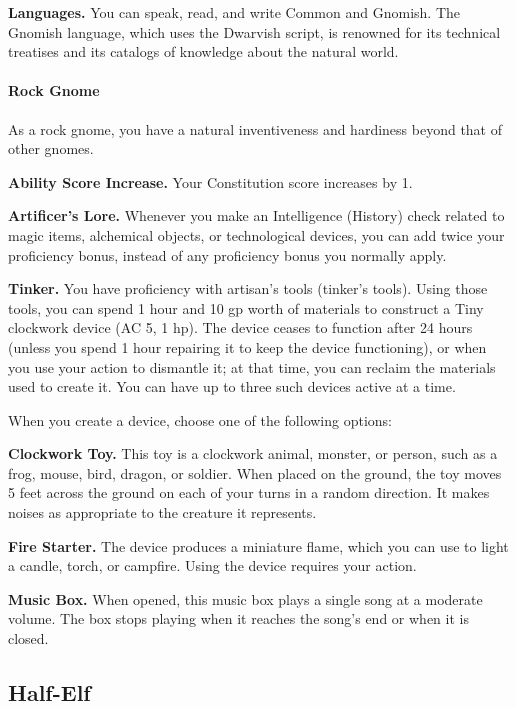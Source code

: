 \textbf{Languages.} You can speak, read, and write Common and Gnomish.
The Gnomish language, which uses the Dwarvish script, is renowned for
its technical treatises and its catalogs of knowledge about the natural
world.

\hypertarget{rock-gnome}{%
\paragraph{Rock Gnome}\label{rock-gnome}}

As a rock gnome, you have a natural inventiveness and hardiness beyond
that of other gnomes.

\textbf{Ability Score Increase.} Your Constitution score increases by 1.

\textbf{Artificer's Lore.} Whenever you make an Intelligence (History)
check related to magic items, alchemical objects, or technological
devices, you can add twice your proficiency bonus, instead of any
proficiency bonus you normally apply.

\textbf{Tinker.} You have proficiency with artisan's tools (tinker's
tools). Using those tools, you can spend 1 hour and 10 gp worth of
materials to construct a Tiny clockwork device (AC 5, 1 hp). The device
ceases to function after 24 hours (unless you spend 1 hour repairing it
to keep the device functioning), or when you use your action to
dismantle it; at that time, you can reclaim the materials used to create
it. You can have up to three such devices active at a time.

When you create a device, choose one of the following options:

\textbf{Clockwork Toy.} This toy is a clockwork animal, monster, or
person, such as a frog, mouse, bird, dragon, or soldier. When placed on
the ground, the toy moves 5 feet across the ground on each of your turns
in a random direction. It makes noises as appropriate to the creature it
represents.

\textbf{Fire Starter.} The device produces a miniature flame, which you
can use to light a candle, torch, or campfire. Using the device requires
your action.

\textbf{Music Box.} When opened, this music box plays a single song at a
moderate volume. The box stops playing when it reaches the song's end or
when it is closed.

\hypertarget{half-elf}{%
\subsection{Half-Elf}\label{half-elf}}

